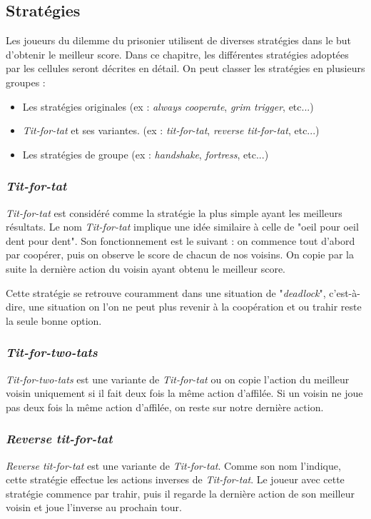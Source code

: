 \documentclass[a4paper, french]{article}
\begin{document}
\pagebreak
\subsection{Stratégies}
Les joueurs du dilemme du prisonier utilisent de diverses stratégies\cite{StratIPD}\cite{StratIPD2} dans le but d'obtenir le meilleur score. Dans ce chapitre, les différentes stratégies adoptées par les cellules seront décrites en détail. On peut classer les stratégies en plusieurs groupes :
\begin{itemize}
    \item Les stratégies originales (ex : \textit{always cooperate}, \textit{grim trigger}, etc...)
    \item \textit{Tit-for-tat} et ses variantes. (ex : \textit{tit-for-tat}, \textit{reverse tit-for-tat}, etc...)
    \item Les stratégies de groupe (ex : \textit{handshake}, \textit{fortress}, etc...)
\end{itemize}

\subsubsection{\textit{Tit-for-tat}}
\textit{Tit-for-tat} est considéré comme la stratégie la plus simple ayant les meilleurs résultats\cite{TFT}. Le nom \textit{Tit-for-tat} implique une idée similaire à celle de "oeil pour oeil dent pour dent". Son fonctionnement est le suivant : on commence tout d'abord par coopérer, puis on observe le score de chacun de nos voisins. On copie par la suite la dernière action du voisin ayant obtenu le meilleur score.

Cette stratégie se retrouve couramment dans une situation de "\textit{deadlock}", c'est-à-dire, une situation on l'on ne peut plus revenir à la coopération et ou trahir reste la seule bonne option.

\subsubsection{\textit{Tit-for-two-tats}}
\textit{Tit-for-two-tats} est une variante de \textit{Tit-for-tat} ou on copie l'action du meilleur voisin uniquement si il fait deux fois la même action d'affilée. Si un voisin ne joue pas deux fois la même action d'affilée, on reste sur notre dernière action.

\subsubsection{\textit{Reverse tit-for-tat}}
\textit{Reverse tit-for-tat} est une variante de \textit{Tit-for-tat}. Comme son nom l'indique, cette stratégie effectue les actions inverses de \textit{Tit-for-tat}. Le joueur avec cette stratégie commence par trahir, puis il regarde la dernière action de son meilleur voisin et joue l'inverse au prochain tour.
\end{document}
